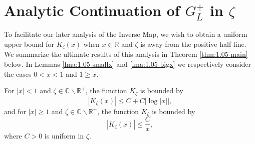 \documentclass[GreensFunctions.tex]{subfiles}
\begin{document}
\section{Analytic Continuation of $G_L^+$ in $\zeta$}

To facilitate our later analysis of the Inverse Map, we wish to obtain a uniform upper 
bound for $K_{\zeta}(x)$ when $x\in \mathbb R$ and $\zeta$ is away from the 
positive half line. We summarize the ultimate results of this analysis in Theorem 
\ref{thm:1.05-main} below. In Lemmas \ref{lma:1.05-smallx} and \ref{lma:1.05-bigx} 
we respectively consider the cases $0< x < 1$ and $1 \geq x$.

\begin{thm}\label{thm:1.05-main}
	For $|x| < 1$ and $\zeta \in \mathbb C \backslash \mathbb R^+$, 
	the function $K_\zeta$ is bounded by
	\[
		\left| K_\zeta(x) \right| \leq C + C \big| \log|x| \big|,
	\]
	and for $|x| \geq 1$ and $\zeta \in \mathbb C \backslash \mathbb R^+$, 
	the function $K_\zeta$ is bounded by
	\[
		\left| K_\zeta(x) \right| \leq \frac{C}{x},
	\]
	where $C>0$ is uniform in $\zeta$.
\end{thm}
\end{document}
